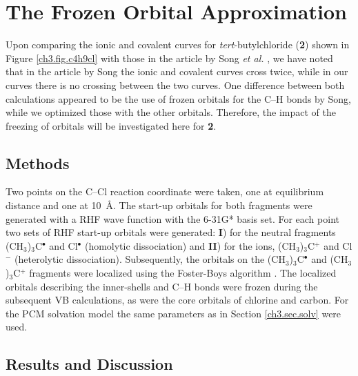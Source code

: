 \section{The Frozen Orbital Approximation}

Upon comparing the ionic and covalent curves for \textit{tert}-butylchloride (\textbf{2}) shown in Figure \ref{ch3.fig.c4h9cl} with those in the article by Song \textit{et al.} \cite{song}, we have noted that in the article by Song the ionic and covalent curves cross twice, while in our curves there is no crossing between the two curves. One difference between both calculations appeared to be the use of frozen orbitals for the C--H bonds by Song, while we optimized those with the other orbitals. Therefore, the impact of the freezing of orbitals will be investigated here for \textbf{2}.

\subsection{Methods}

Two points on the C--Cl reaction coordinate were taken, one at equilibrium distance and one at \mbox{10 \AA}. The start-up orbitals for both fragments were generated with a RHF wave function with the 6-31G* basis set. For each point two sets of RHF start-up orbitals were generated: \textbf{I}) for the neutral fragments (CH$_3$)$_3$C$^\bullet$ and Cl$^\bullet$ (homolytic dissociation) and \textbf{II}) for the ions, (CH$_3$)$_3$C$^{+}$ and Cl$^{-}$ (heterolytic dissociation). Subsequently, the orbitals on the (CH$_3$)$_3$C$^\bullet$ and (CH$_3$)$_3$C$^{+}$ fragments were localized using the Foster-Boys algorithm \cite{foster}. The localized orbitals describing the inner-shells and C--H bonds were frozen during the subsequent VB calculations, as were the core orbitals of chlorine and carbon.  For the PCM solvation model the same parameters as in Section \ref{ch3.sec.solv} were used.

\subsection{\label{ch3.sec.res.freez}Results and Discussion}

